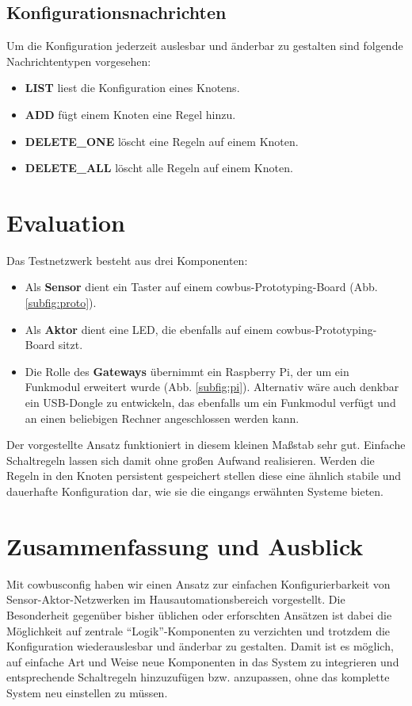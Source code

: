 \documentclass[conference]{IEEEtran}
\begin{document}
    \subsection{Konfigurationsnachrichten}
        Um die Konfiguration jederzeit auslesbar und änderbar zu gestalten
        sind folgende Nachrichtentypen vorgesehen:

        \begin{itemize}
            \item \textbf{LIST} liest die Konfiguration eines Knotens.
            \item \textbf{ADD} fügt einem Knoten eine Regel hinzu.
            \item \textbf{DELETE\_ONE} löscht eine Regeln auf einem Knoten.
            \item \textbf{DELETE\_ALL} löscht alle Regeln auf einem Knoten.
        \end{itemize}



\section{Evaluation}
    Das Testnetzwerk besteht aus drei Komponenten:
    \begin{itemize}
        \item Als \textbf{Sensor} dient ein Taster auf einem
            cowbus-Prototyping-Board (Abb. \ref{subfig:proto}).
        \item Als \textbf{Aktor} dient eine \ac{LED},
            die ebenfalls auf einem cowbus-Prototyping-Board sitzt.
        \item Die Rolle des \textbf{Gateways} übernimmt ein Raspberry Pi,
            der um ein Funkmodul erweitert wurde (Abb. \ref{subfig:pi}).
            Alternativ wäre auch denkbar ein USB-Dongle zu entwickeln,
            das ebenfalls um ein Funkmodul verfügt und an einen beliebigen
            Rechner angeschlossen werden kann.
    \end{itemize}

    Der vorgestellte Ansatz funktioniert in diesem kleinen Maßstab sehr gut.
    Einfache Schaltregeln lassen sich damit ohne großen Aufwand
    realisieren. Werden die Regeln in den Knoten persistent gespeichert
    stellen diese eine ähnlich stabile und dauerhafte Konfiguration dar, wie
    sie die eingangs erwähnten Systeme bieten.


\section{Zusammenfassung und Ausblick}
    Mit cowbusconfig haben wir einen Ansatz zur einfachen Konfigurierbarkeit
    von Sensor-Aktor-Netzwerken im Hausautomationsbereich vorgestellt.
    Die Besonderheit gegenüber bisher üblichen oder erforschten Ansätzen ist
    dabei die Möglichkeit auf zentrale \enquote{Logik}-Komponenten
    zu verzichten und trotzdem die Konfiguration wiederauslesbar und
    änderbar zu gestalten.
    Damit ist es möglich, auf einfache Art und Weise neue Komponenten in das
    System zu integrieren und entsprechende Schaltregeln hinzuzufügen bzw.
    anzupassen, ohne das komplette System neu einstellen zu müssen.
\end{document}
